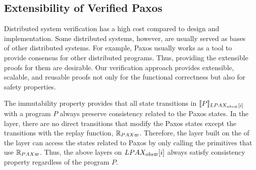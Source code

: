 
\subsection{Extensibility of Verified Paxos}
\label{subsec:extensibility-of-verified-paxos}

Distributed system verification has a high cost compared to design and implementation.
Some distributed systems, however, are usually served as bases of other distributed systems. 
For example, Paxos usually works as a tool to provide consensus for other distributed programs.
Thus, providing the extensible proofs for them are desirable. 
Our verification approach provides extensible, scalable, and reusable proofs not only for the functional correctness but also for safety properties. 

The immutability property provides that all state transitions in $\sem{LPAX_{abs\witness}[i]}{P}$ with a program $P$ always preserve consistency related to the Paxos states. 
In the layer, there are no direct transitions that modify the Paxos states except the transitions with the replay function,  $\replay_{PAX\witness}$.
Therefore, the layer built on the of the layer can access the states related to Paxos by only calling the primitives that use $\replay_{PAX\witness}$.
Thus, the above layers on $LPAX_{abs\witness}[i]$ always satisfy consistency property regardless of the program $P$. 


